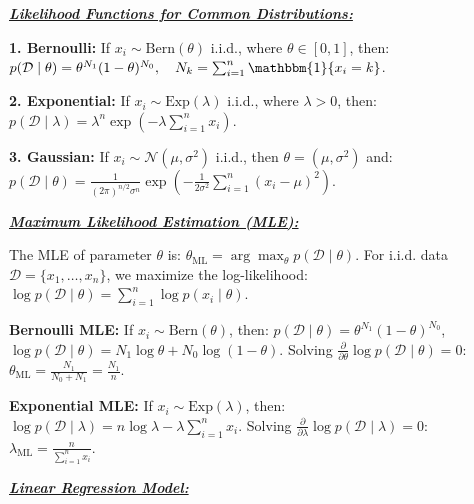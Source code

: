 \documentclass[10pt]{article}
\newcommand{\bulletPoint}[1]{\ul{\textit{\textbf{#1}}}}
\begin{document}
\begin{multicols*}{3}
\bulletPoint{Likelihood Functions for Common Distributions:}\quad

\textbf{1. Bernoulli:} If $x_i \sim \text{Bern}(\theta)$ i.i.d., where $\theta \in [0,1]$, then:
$p(\mathcal{D} \mid \theta) = \theta^{N_1} (1 - \theta)^{N_0}, \quad N_k = \sum_{i=1}^{n} \mathbbm{1}\{x_i = k\}$. 

\textbf{2. Exponential:} If $x_i \sim \text{Exp}(\lambda)$ i.i.d., where $\lambda > 0$, then:
$p(\mathcal{D} \mid \lambda) = \lambda^n \exp \left( -\lambda \sum_{i=1}^{n} x_i \right)$. 

\textbf{3. Gaussian:} If $x_i \sim \mathcal{N}(\mu, \sigma^2)$ i.i.d., then $\theta = (\mu, \sigma^2)$ and:
$p(\mathcal{D} \mid \theta) = \frac{1}{(2\pi)^{n/2} \sigma^n} \exp \left( -\frac{1}{2\sigma^2} \sum_{i=1}^{n} (x_i - \mu)^2 \right)$.


\bulletPoint{Maximum Likelihood Estimation (MLE):}\quad

The MLE of parameter $\theta$ is: $\theta_{\text{ML}} = \arg\max_{\theta} p(\mathcal{D} \mid \theta)$.
For i.i.d. data $\mathcal{D} = \{x_1, \dots, x_n\}$, we maximize the log-likelihood:
$\log p(\mathcal{D} \mid \theta) = \sum_{i=1}^{n} \log p(x_i \mid \theta)$. 

\textbf{Bernoulli MLE:} If $x_i \sim \text{Bern}(\theta)$, then: $p(\mathcal{D} \mid \theta) = \theta^{N_1} (1 - \theta)^{N_0}$,
$\log p(\mathcal{D} \mid \theta) = N_1 \log \theta + N_0 \log (1 - \theta)$. Solving $\frac{\partial}{\partial \theta} \log p(\mathcal{D} \mid \theta) = 0$:
$\theta_{\text{ML}} = \frac{N_1}{N_0 + N_1} = \frac{N_1}{n}$. 

\textbf{Exponential MLE:} If $x_i \sim \text{Exp}(\lambda)$, then: $\log p(\mathcal{D} \mid \lambda) = n \log \lambda - \lambda \sum_{i=1}^{n} x_i$.
Solving $\frac{\partial}{\partial \lambda} \log p(\mathcal{D} \mid \lambda) = 0$: $\lambda_{\text{ML}} = \frac{n}{\sum_{i=1}^{n} x_i}$.


\bulletPoint{Linear Regression Model:}\quad


\end{multicols*}
\end{document}

